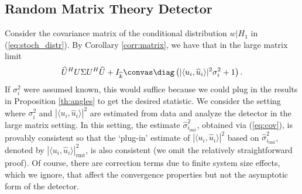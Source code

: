 \subsection{Random Matrix Theory Detector}\label{sec:optimal_stoch}
Consider the covariance matrix of the conditional distribution $w|H_1$ in (\ref{eq:stoch_distr}). By Corollary \ref{corr:matrix}, we have that in the large matrix limit
\begin{equation}\label{eq:cov mat}
\widehat{U}^HU\Sigma U^H\widehat{U}+I_{\widehat{k}} \convas \diag\left(|\langle u_i,\widehat{u}_i\rangle|^2\sigma_i^2 + 1\right).
\end{equation}
If $\sigma_i^{2}$ were assumed known, this would suffice because we could plug in the results in Proposition \ref{th:angles} to get the desired statistic. We consider the setting where $\sigma_i^{2}$ and $|\langle u_i,\widehat{u}_i\rangle|^2$ are estimated from data and analyze the detector in the large matrix setting. In this setting, the estimate $\widehat{\sigma}_{i_\text{rmt}}^2$,  obtained via (\ref{eq:cov}), is provably consistent so that the `plug-in' estimate of $|\langle u_i,\widehat{u}_i\rangle|^2$ based on $\widehat{\sigma}_{i_\text{rmt}}^2$, denoted by $|\langle u_i,\widehat{u}_i\rangle|^2_\text{rmt}$, is also consistent (we omit the relatively straightforward proof). Of course, there are correction terms due to finite system size effects, which we ignore, that affect the convergence properties but not the asymptotic form of the detector.



